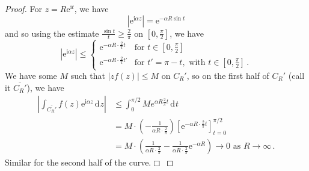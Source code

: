 \documentclass{article}
\theoremstyle{plain}\theoremheaderfont{\normalfont\itshape}\theorembodyfont{\rmfamily}\theoremseparator{.}\newtheorem*{rem}{Remark}\newtheorem*{ex}{Example}\newtheorem*{proof}{Proof}\newtheorem*{altp}{Alternative proof}\newtheorem*{con}{Consequences}\newtheorem*{notn}{Notations}\newtheorem*{cau}{Caution}\newtheorem*{term}{Terminology}\newtheorem*{keyex}{Key example}
\theoremstyle{plain}\theoremheaderfont{\normalfont\bfseries}\theorembodyfont{\rmfamily}\theoremseparator{.}\newtheorem{thm}{Theorem}[section]\newtheorem{lem}[thm]{Lemma}\newtheorem{prop}[thm]{Proposition}\newtheorem*{cor}{Corollary}\newtheorem{defn}[thm]{Definition}\newtheorem{clm}[thm]{Claim}\newtheorem{clminproof}{Claim}\newtheorem{leminproof}{Lemma}\newtheorem{app}{Application}
\theoremstyle{break}\theoremheaderfont{\normalfont\itshape}\theorembodyfont{\rmfamily}\theoremseparator{.\medskip}\newtheorem*{proofskip}{Proof}\newtheorem*{exs}{Examples}\newtheorem*{rems}{Remarks}\newtheorem*{rec}{Recall}\newtheorem*{ppts}{Properties}
\theoremstyle{break}\theoremheaderfont{\normalfont\bfseries}\theorembodyfont{\rmfamily}\theoremseparator{.\medskip}\newtheorem{lemskip}[thm]{Lemma}\newtheorem{defnskip}[thm]{Definition}\newtheorem{propskip}[thm]{Proposition}\newtheorem{thmskip}[thm]{Theorem}
\numberwithin{equation}{section}
\newcommand{\ii}{\mathrm{i}}
\newcommand{\ee}{\mathrm{e}}
\newcommand{\qed}{\hfill\ensuremath{\Box}}
\newcommand{\abs}[1]{\left|#1\right|}
\newcommand{\dd}[2][]{\,\mathrm{d}^{#1} #2}
\begin{document}
    \begin{proof}
        For \(z=R\ee^{\ii t}\), we have
        \[\abs{\ee^{\ii\alpha z}}=\ee^{-\alpha R\sin t}\]
        and so using the estimate \(\frac{\sin t}{t}\ge\frac{2}{\pi}\) on \([0,\frac{\pi}{2}]\), we have
        \[\abs{\ee^{\ii\alpha z}}\le\begin{cases}
            \ee^{-\alpha R\cdot\frac{2}{\pi}t} & \text{for }t\in[0,\frac{\pi}{2}]\\
            \ee^{-\alpha R\cdot\frac{2}{\pi}t'} & \text{for }t'=\pi-t,\text{ with }t\in[0,\frac{\pi}{2}]\,.
        \end{cases}\]
        We have some \(M\) such that \(\abs{zf(z)}\le M\) on \(C_R'\), so on the first half of \(C_R'\) (call it \(\overline{C_R'}\)), we have
        \begin{align*}
            \abs{\int_{\overline{C_R'}}f(z)\ee^{\ii \alpha z}\dd{z}}&\le \int_{0}^{\pi/2}Me^{\alpha R\frac{2}{\pi}t}\dd{t}\\
            &=M\cdot\left(-\frac{1}{\alpha R\cdot\frac{2}{\pi}}\right)\left[\ee^{-\alpha R\cdot\frac{2}{\pi}t}\right]_{t=0}^{\pi/2}\\
            &=M\cdot\left(\frac{1}{\alpha R\cdot\frac{2}{\pi}}-\frac{1}{\alpha R\cdot\frac{2}{\pi}}\ee^{-\alpha R}\right)\to 0\text{ as }R\to\infty\,.
        \end{align*}
        Similar for the second half of the curve.\qed
    \end{proof}
\end{document}
